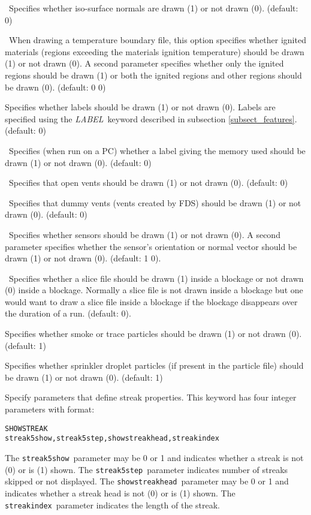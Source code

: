 \documentclass[11pt,twoside]{book}
\newcommand{\hitem}[1]{\item[{\bf #1} \hfill]}
\begin{document}
\hitem{SHOWISONORMALS}\ Specifies whether iso-surface normals are drawn
(1) or not drawn (0).  (default: 0)

\hitem{SHOWIGNITION}\ When drawing a temperature boundary file, this option
specifies whether ignited materials (regions exceeding the materials
ignition temperature) should be drawn (1) or not drawn (0).
A second parameter specifies whether only the ignited regions
should be drawn (1) or both the ignited regions and other regions should be drawn (0).
(default: 0 0)


\hitem{SHOWLABELS}Specifies whether labels should be drawn (1) or
not drawn (0).  Labels are specified using the {\em LABEL}\
keyword described in subsection \ref{subsect_features}. (default:
0)

\hitem{SHOWMEMLOAD}\ Specifies (when run on a PC) whether a label
giving the memory used should be drawn (1) or not drawn (0).
(default: 0)

\hitem{SHOWOPENVENTS}\ Specifies that open vents should be drawn
(1) or not drawn (0).  (default: 0)

\hitem{SHOWDUMMYVENTS}\ Specifies that dummy vents (vents created
by FDS) should be drawn (1) or not drawn (0).  (default: 0)

\hitem{SHOWSENSORS}\ Specifies whether sensors should be drawn (1) or not drawn (0).
A second parameter specifies whether the sensor's orientation or normal vector
should be drawn (1) or not drawn (0). (default: 1 0).

\hitem{SHOWSLICEINOBST}\ Specifies whether a slice file should be drawn (1) inside
a blockage or not drawn (0) inside a blockage.  Normally a slice file
is not drawn inside a blockage but one would want to draw a
slice file inside a blockage if the blockage disappears over the
duration of a run.  (default: 0).


\hitem{SHOWSMOKEPART}Specifies whether smoke or trace particles
should be drawn (1) or not drawn (0). (default: 1)

\hitem{SHOWSPRINKPART}Specifies whether
sprinkler droplet particles (if present in the particle file)
should be drawn (1) or not drawn (0).
(default: 1)

\hitem{SHOWSTREAK}Specify parameters that define streak properties.  This keyword
has four integer parameters with format:
\begin{lstlisting}
SHOWSTREAK
streak5show,streak5step,showstreakhead,streakindex
\end{lstlisting}
The {\tt streak5show}\ parameter may be 0 or 1 and indicates whether a
streak is not (0) or is (1) shown. The {\tt streak5step}\ parameter
indicates number of streaks skipped or not displayed.
The {\tt showstreakhead}\ parameter may be 0 or 1 and indicates
whether a streak head is not (0) or is (1) shown.
The {\tt streakindex}\ parameter indicates the length of the streak.
\end{document}
